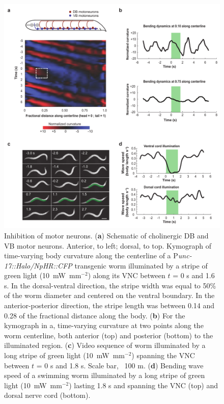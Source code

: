 \begin{figure} 
\includegraphics[width=\textwidth]{figures/colbert3}
\caption[Inhibition of motor neurons. ]{ Inhibition of motor neurons.  (\textbf{a}) Schematic of cholinergic DB and VB motor neurons. Anterior, to left; dorsal, to top. Kymograph of time-varying body curvature along the centerline of a P\textit{unc-17::Halo/NpHR::CFP} transgenic worm illuminated by a stripe of green light (10~mW~mm$^{-2}$) along its VNC between $t$ = 0 s and 1.6 s. In the dorsal-ventral direction, the stripe width was equal to 50\% of the worm diameter and centered on the ventral boundary. In the anterior-posterior direction, the stripe length was between 0.14 and 0.28 of the fractional distance along the body. (\textbf{b}) For the kymograph in a, time-varying curvature at two points along the worm centerline, both anterior (top) and posterior (bottom) to the illuminated region. (\textbf{c}) Video sequence of worm illuminated by a long stripe of green light (10~mW~mm$^{-2}$) spanning the VNC between $t$ = 0 s and 1.8 s. Scale bar, ~100 \textmu m. (\textbf{d}) Bending wave speed of a swimming worm illuminated by a long stripe of green light (10~mW~mm$^{-2}$) lasting 1.8 s and spanning the VNC (top) and dorsal nerve cord (bottom).\label{fig:colbert3}}
\end{figure}

